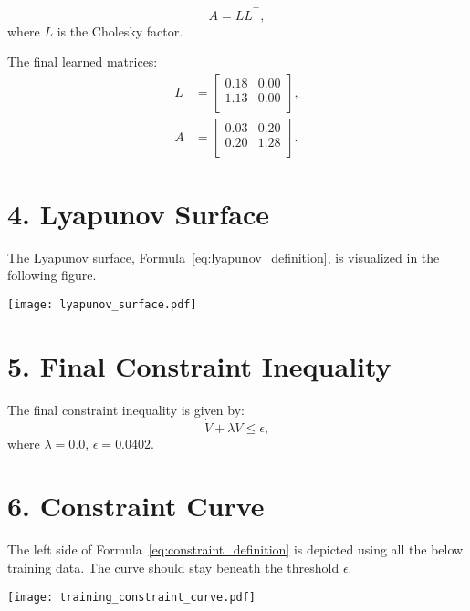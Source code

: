 \documentclass[11pt]{article}
\begin{document}
\begin{equation}
A = L L^\top,
\end{equation}
where $L$ is the Cholesky factor.

The final learned matrices:
\begin{align}
L &= \begin{bmatrix}
0.18 & 0.00 \\
1.13 & 0.00 \\
\end{bmatrix}, \\
A &= \begin{bmatrix}
0.03 & 0.20 \\
0.20 & 1.28 \\
\end{bmatrix}.
\end{align}

\section*{4. Lyapunov Surface}
The Lyapunov surface, Formula~\eqref{eq:lyapunov_definition}, is visualized in the following figure.
\begin{center}
\texttt{[image: lyapunov\_surface.pdf]}
\end{center}

\section*{5. Final Constraint Inequality}
The final constraint inequality is given by:
\begin{equation}
\dot{V} + \lambda V \leq \epsilon,
\label{eq:constraint_definition}
\end{equation}
where $\lambda = 0.0$, $\epsilon = 0.0402$.

\section*{6. Constraint Curve}
The left side of Formula~\eqref{eq:constraint_definition} is depicted using all the below training data. The curve should stay beneath the threshold $\epsilon$.

\begin{center}
\texttt{[image: training\_constraint\_curve.pdf]}
\end{center}
\end{document}
